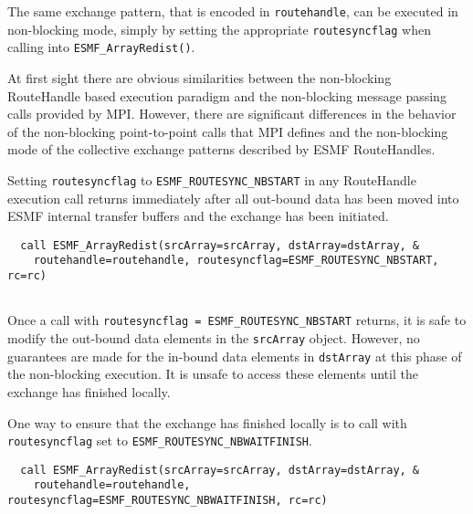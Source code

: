 
   The same exchange pattern, that is encoded in {\tt routehandle}, can be 
   executed in non-blocking mode, simply by setting the appropriate
   {\tt routesyncflag} when calling into {\tt ESMF\_ArrayRedist()}.
  
   At first sight there are obvious similarities between the non-blocking
   RouteHandle based execution paradigm and the non-blocking message passing
   calls provided by MPI. However, there are significant differences in
   the behavior of the non-blocking point-to-point calls that MPI defines and
   the non-blocking mode of the collective exchange patterns described by ESMF
   RouteHandles.
  
   Setting {\tt routesyncflag} to {\tt ESMF\_ROUTESYNC\_NBSTART} in any RouteHandle
   execution call returns immediately after all out-bound data has been moved
   into ESMF internal transfer buffers and the exchange has been initiated. 

 \begin{verbatim}
  call ESMF_ArrayRedist(srcArray=srcArray, dstArray=dstArray, &
    routehandle=routehandle, routesyncflag=ESMF_ROUTESYNC_NBSTART, rc=rc)
 
\end{verbatim}
 

   Once a call with {\tt routesyncflag = ESMF\_ROUTESYNC\_NBSTART} returns, it is safe
   to modify the out-bound data elements in the {\tt srcArray} object. However,
   no guarantees are made for the in-bound data elements in {\tt dstArray} at
   this phase of the non-blocking execution. It is unsafe to access these
   elements until the exchange has finished locally.
  
   \begin{sloppypar}
   One way to ensure that the exchange has finished locally is to call 
   with {\tt routesyncflag} set to {\tt ESMF\_ROUTESYNC\_NBWAITFINISH}.
   \end{sloppypar} 

 \begin{verbatim}
  call ESMF_ArrayRedist(srcArray=srcArray, dstArray=dstArray, &
    routehandle=routehandle, routesyncflag=ESMF_ROUTESYNC_NBWAITFINISH, rc=rc)
 
\end{verbatim}
 
